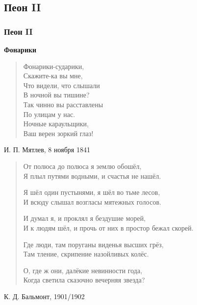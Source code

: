 \documentclass{beamer}
\begin{document}
\subsection{Пеон II}\label{sec:sum}


\begin{frame}
\frametitle{Пеон II}

\begin{center}
\textbf{Фонарики}
\end{center}

\begin{verse}
Фонарики-сударики, \\
Скажите-ка вы мне, \\
Что видели, что слышали \\
В ночной вы тишине? \\
Так чинно вы расставлены \\
По улицам у нас. \\
Ночные караульщики,\\ 
Ваш верен зоркий глаз! 
\end{verse}

И. П. Мятлев, 8 ноября 1841

\end{frame}


\begin{frame}

\begin{verse}
От полюса до полюса я землю обошёл,\\
Я плыл путями водными, и счастья не нашёл.

Я шёл один пустынями, я шёл во тьме лесов,\\
И всюду слышал возгласы мятежных голосов.

И думал я, и проклял я бездушие морей,\\
И к людям шёл, и прочь от них в простор бежал скорей.

Где люди, там поруганы виденья высших грёз,\\
Там тление, скрипение назойливых колёс.

О, где ж они, далёкие невинности года,\\
Когда светила сказочно вечерняя звезда?

\end{verse}

К. Д. Бальмонт, 1901/1902

\end{frame}
\end{document}
